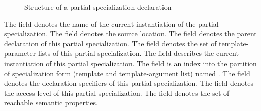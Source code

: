%
\begin{figure}[H]
	\centering
	\caption{Structure of a partial specialization declaration}
	\label{fig:ifc-partial-specialization-decl-structure}
\end{figure}

The  field denotes the name of the current instantiation of the partial specialization.
The  field denotes the source location.
The  field denotes the parent declaration of this partial specialization.
The  field denotes the set of template-parameter lists of this partial specialization.
The  field describes the current instantiation of this partial specialization.
The  field is an index into the partition of specialization form (template and template-argument list) named .
The  field denotes the declaration specifiers of this partial specialization.
The  field denotes the access level of this partial specialization.
The  field denotes the set of reachable semantic properties.



\subsection{} 
\label{sec:ifc:DeclSort:Specialization}

